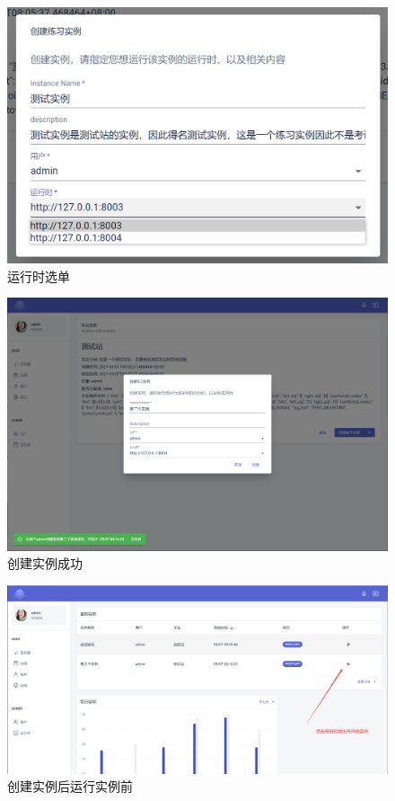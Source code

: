 \begin{figure}[htbp!]
    \centering
    \includegraphics[width=\textwidth]{figures/png/runtime_list.png}
    \caption{\label{runtime_list}运行时选单}
\end{figure}

\begin{figure}[htbp!]
    \centering
    \includegraphics[width=\textwidth]{figures/png/dialog_succ.png}
    \caption{\label{dialog_succ}创建实例成功}
\end{figure}

\begin{figure}[htbp!]
    \centering
    \includegraphics[width=\textwidth]{figures/png/after_create.png}
    \caption{\label{after_create}创建实例后运行实例前}
\end{figure}

